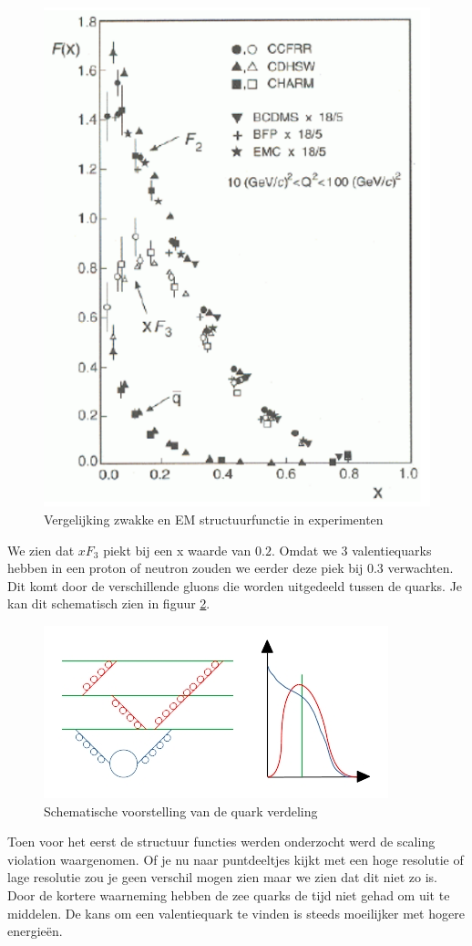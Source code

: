 \documentclass[../main.tex]{subfiles}
\begin{document}
\begin{figure}[h]
    \centering
    \includegraphics[width=0.4\linewidth]{DIS_nucleon_structuur_pdf/neutr_scat_exp.png}
    \caption{Vergelijking zwakke en EM structuurfunctie in experimenten}%
    \label{fig:neutr_scat_exp}
\end{figure}

We zien dat $xF_3$ piekt bij een x waarde van $0.2$. Omdat we 3 valentiequarks hebben in een proton of neutron zouden we eerder deze piek bij $0.3$ verwachten. Dit komt door de verschillende gluons die worden uitgedeeld tussen de quarks. Je kan dit schematisch zien in figuur \ref{fig:valance_quark_dist}.
 
\begin{figure}[h]
    \centering
    \includegraphics[width=0.8\linewidth]{DIS_nucleon_structuur_pdf/valance_quark_dist.jpg}
    \caption{Schematische voorstelling van de quark verdeling}%
    \label{fig:valance_quark_dist}
\end{figure}

Toen voor het eerst de structuur functies werden onderzocht werd de scaling violation waargenomen. Of je nu naar puntdeeltjes kijkt met een hoge resolutie of lage resolutie zou je geen verschil mogen zien maar we zien dat dit niet zo is. Door de kortere waarneming hebben de zee quarks de tijd niet gehad om uit te middelen. De kans om een valentiequark te vinden is steeds moeilijker met hogere energieën.
\end{document}
